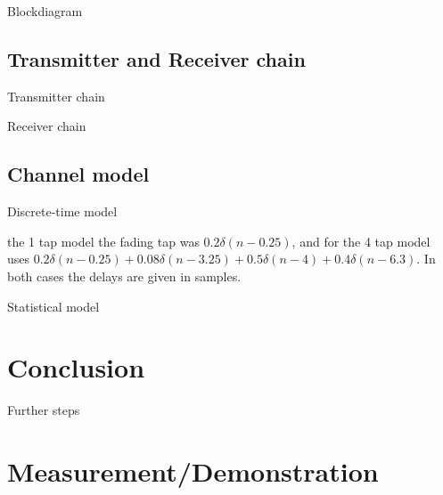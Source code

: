 \documentclass[xetex, onlymath, handout]{beamer}
\begin{document}
\begin{frame}{Blockdiagram}
	\begin{figure}
		\centering
		\resizebox{.9\linewidth}{!}{
			
		}
		
	\end{figure}
\end{frame}



\subsection{Transmitter and Receiver chain}

\begin{frame}{Transmitter chain}
	
\end{frame}

\begin{frame}{Receiver chain}
	
\end{frame}

\subsection{Channel model}

\begin{frame}{Discrete-time model}
	\begin{figure}
		\centering
		
	\end{figure}
	the 1 tap model the fading tap was \(0.2\delta(n - 0.25)\), and for the 4 tap model uses \(0.2 \delta(n - 0.25) + 0.08 \delta(n - 3.25) + 0.5 \delta(n - 4) + 0.4 \delta(n - 6.3)\). In both cases the delays are given in samples.
\end{frame}

\begin{frame}{Statistical model}
	
\end{frame}

\section{Conclusion}

\begin{frame}{Further steps}
	
\end{frame}

\section{Measurement/Demonstration}

\end{document}
